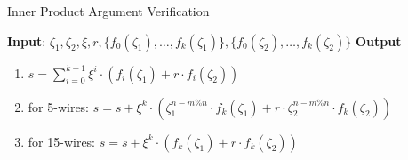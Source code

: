 \begin{algorithm}[H]
\caption{Inner Product Argument Verification}
\textbf{Input}: $\zeta_1, \zeta_2, \xi, r, \{f_0(\zeta_1), \dots, f_k(\zeta_1) \}, \{f_0(\zeta_2), \dots, f_k(\zeta_2) \}$ %
\textbf{Output }
\begin{enumerate}
	\item $s = \sum\limits_{i = 0}^{k - 1} \xi^i \cdot (f_i(\zeta_1) + r \cdot f_i(\zeta_2))$
	\item for 5-wires: $s = s + \xi^k \cdot (\zeta_1^{n - m \% n} \cdot f_k(\zeta_1) + r \cdot \zeta_2^{n - m \% n} \cdot f_k(\zeta_2))$
	\item for 15-wires: $s = s + \xi^k \cdot (f_k(\zeta_1) + r \cdot f_k(\zeta_2))$
\end{enumerate}
\end{algorithm}


